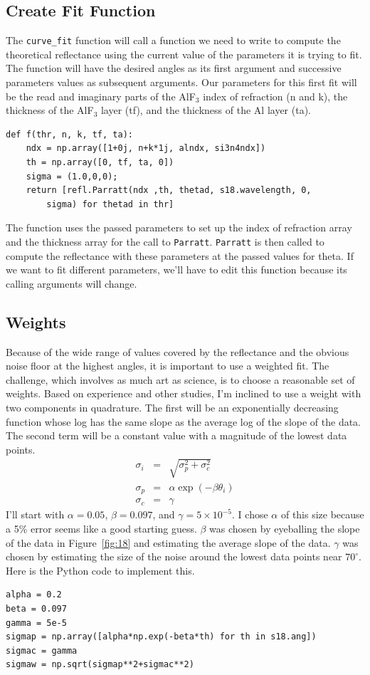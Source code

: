 \documentclass[english]{scrartcl}
\begin{document}
\subsection{Create Fit Function}
The \texttt{curve\_fit} function will call a function we need to write to
compute the theoretical reflectance using the current value of the parameters
it is trying to fit. The function will have the desired angles as its first
argument and successive parameters values as subsequent arguments.  Our
parameters for this first fit
will be the read and imaginary parts of the AlF$_3$ index of refraction (n and k),
the thickness of the AlF$_3$ layer (tf), and the thickness of the Al layer (ta).
\begin{lstlisting}
def f(thr, n, k, tf, ta):
    ndx = np.array([1+0j, n+k*1j, alndx, si3n4ndx])
    th = np.array([0, tf, ta, 0])
    sigma = (1.0,0,0);
    return [refl.Parratt(ndx ,th, thetad, s18.wavelength, 0, 
    	sigma) for thetad in thr]
\end{lstlisting}
The function uses the passed parameters to set up the index of refraction
array and the thickness array for the call to \texttt{Parratt}. \texttt{Parratt}
is then called to compute the reflectance with these parameters at the passed
values for theta.
If we want to fit different parameters, we'll have to edit this function because
its calling arguments will change.

\subsection{Weights}
Because of the wide range of values covered by the reflectance and
the obvious noise floor at the highest angles, it is important to
use a weighted fit. The challenge, which involves as much art as
science, is to choose a reasonable set of weights. Based on experience
and other studies, I'm inclined to use a weight with two components
in quadrature. The first will be an exponentially decreasing function
whose log has the same slope as the average log of the slope of the
data. The second term will be a constant value with a magnitude of the
lowest data points.
\begin{eqnarray}
\sigma_i &=& \sqrt{\sigma_p^2+\sigma_c^2}\\
\sigma_p &=& \alpha \exp(-\beta\theta_i)\\
\sigma_c &=& \gamma
\end{eqnarray}
I'll start with $\alpha=0.05$, $\beta=0.097$,
and $\gamma=5\times 10^{-5}$. I chose $\alpha$ of this size because a
5\% error seems like a good starting guess. $\beta$ was chosen by
eyeballing the slope of the data in Figure~\ref{fig:18} and estimating
the average slope of the data. $\gamma$ was chosen by estimating the size
of the noise around the lowest data points near $70^\circ$. Here is
the Python code to implement this.
\begin{lstlisting}
alpha = 0.2
beta = 0.097
gamma = 5e-5
sigmap = np.array([alpha*np.exp(-beta*th) for th in s18.ang])
sigmac = gamma
sigmaw = np.sqrt(sigmap**2+sigmac**2)
\end{lstlisting}
\end{document}
